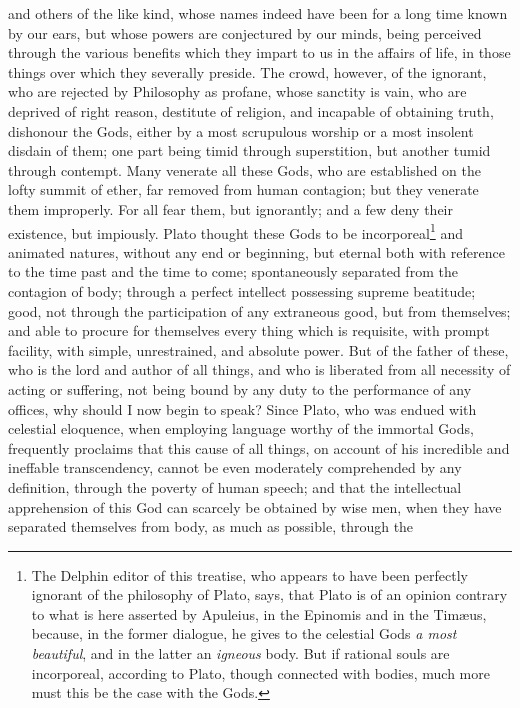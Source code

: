 \documentclass[12pt]{article}
\begin{document}
\noindent and others of the like kind, whose names indeed have been for a long
time known by our ears, but whose powers are conjectured by our minds, being
perceived through the various benefits which they impart to us in the affairs
of life, in those things over which they severally preside. The crowd, however,
of the ignorant, who are rejected by Philosophy as profane, whose sanctity is
vain, who are deprived of right reason, destitute of religion, and incapable of
obtaining truth, dishonour the Gods, either by a most scrupulous worship or a
most insolent disdain of them; one part being timid through superstition, but
another tumid through contempt. Many venerate all these Gods, who are
established on the lofty summit of ether, far removed from human contagion; but
they venerate them improperly. For all fear them, but ignorantly; and a few
deny their existence, but impiously. Plato thought these Gods to be
incorporeal\footnote{The Delphin editor of this treatise, who appears to have
been perfectly ignorant of the philosophy of Plato, says, that Plato is of an
opinion contrary to what is here asserted by Apuleius, in the Epinomis
and in the Tim{\ae}us, because, in the former dialogue, he gives to
the celestial Gods \textit{a most beautiful}, and in the latter an
\textit{igneous} body. But if rational souls are incorporeal, according to
Plato, though connected with bodies, much more must this be the case with the
Gods.} and animated natures, without any end or beginning, but eternal both
with reference to the time past and the time to come; spontaneously separated
from the contagion of body; through a perfect intellect possessing supreme
beatitude; good, not through the participation of any extraneous good, but from
themselves; and able to procure for themselves every thing which is requisite,
with prompt facility, with simple, unrestrained, and absolute power. But of the
father of these, who is the lord and author of all things, and who is liberated
from all necessity of acting or suffering, not being bound by any duty to the
performance of any offices, why should I now begin to speak? Since Plato, who
was endued with celestial eloquence, when employing language worthy of the
immortal Gods, frequently proclaims that this cause of all things, on account
of his incredible and ineffable transcendency, cannot be even moderately
comprehended by any definition, through the poverty of human speech; and that
the intellectual apprehension of this God can scarcely be obtained by wise men,
when they have separated themselves from body, as much as possible, through the
\end{document}
